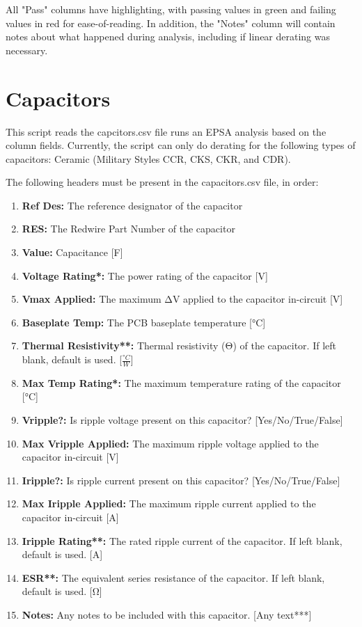 \documentclass[12pt]{article}
\begin{document}
All "Pass" columns have highlighting, with passing values in green and failing values in red for ease-of-reading. In addition, the "Notes" column will contain notes about what happened during analysis, including if linear derating was necessary.


\section{Capacitors}
This script reads the capcitors.csv file runs an EPSA analysis based on the column fields. Currently, the script can only do derating for the following types of capacitors: Ceramic (Military Styles CCR, CKS, CKR, and CDR).

The following headers must be present in the capacitors.csv file, in order:

\begin{enumerate}
    \item \textbf{Ref Des:} The reference designator of the capacitor
    \item \textbf{RES:} The Redwire Part Number of the capacitor
    \item \textbf{Value:} Capacitance [F]
    \item \textbf{Voltage Rating*:} The power rating of the capacitor [V]
    \item \textbf{Vmax Applied:} The maximum ΔV applied to the capacitor in-circuit [V]
    \item \textbf{Baseplate Temp:} The PCB baseplate temperature [°C]
    \item \textbf{Thermal Resistivity**:} Thermal resistivity (Θ) of the capacitor. If left blank, default is used. [\(\frac{°C}{W}\)]
    \item \textbf{Max Temp Rating*:} The maximum temperature rating of the capacitor [°C] 
    \item \textbf{Vripple?:} Is ripple voltage present on this capacitor? [Yes/No/True/False]
    \item \textbf{Max Vripple Applied:} The maximum ripple voltage applied to the capacitor in-circuit [V]
    \item \textbf{Iripple?:} Is ripple current present on this capacitor? [Yes/No/True/False]
    \item \textbf{Max Iripple Applied:} The maximum ripple current applied to the capacitor in-circuit [A]
    \item \textbf{Iripple Rating**:} The rated ripple current of the capacitor. If left blank, default is used. [A]
    \item \textbf{ESR**:} The equivalent series resistance of the capacitor. If left blank, default is used. [Ω]
    \item \textbf{Notes:} Any notes to be included with this capacitor. [Any text***]
\end{enumerate}
\end{document}
